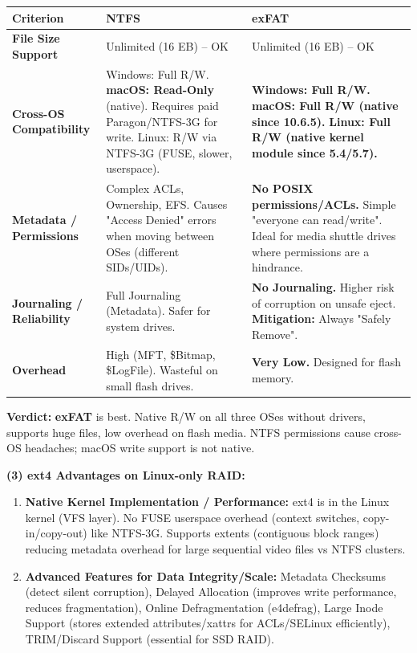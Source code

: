 \documentclass[11pt]{article}
\newcommand{\cle}[1]{{\popxbold\color{popdark}#1}}
\begin{document}
\begin{exoresolu}
\begin{center}
\begin{tabularx}{\linewidth}{|l|X|X|}
\hline
\rowcolor{popblueL}
\textbf{Criterion} & \textbf{NTFS} & \textbf{exFAT} \\
\hline
\textbf{File Size Support} & Unlimited (16 EB) -- OK & Unlimited (16 EB) -- OK \\
\hline
\textbf{Cross-OS Compatibility} & Windows: Full R/W. \textbf{macOS: Read-Only} (native). Requires paid Paragon/NTFS-3G for write. Linux: R/W via NTFS-3G (FUSE, slower, userspace). & \textbf{Windows: Full R/W.} \textbf{macOS: Full R/W (native since 10.6.5).} \textbf{Linux: Full R/W (native kernel module since 5.4/5.7).} \\
\hline
\textbf{Metadata / Permissions} & Complex ACLs, Ownership, EFS. Causes "Access Denied" errors when moving between OSes (different SIDs/UIDs). & \textbf{No POSIX permissions/ACLs.} Simple "everyone can read/write". Ideal for media shuttle drives where permissions are a hindrance. \\
\hline
\textbf{Journaling / Reliability} & Full Journaling (Metadata). Safer for system drives. & \textbf{No Journaling.} Higher risk of corruption on unsafe eject. \textbf{Mitigation:} Always "Safely Remove". \\
\hline
\textbf{Overhead} & High (MFT, \$Bitmap, \$LogFile). Wasteful on small flash drives. & \textbf{Very Low.} Designed for flash memory. \\
\hline
\end{tabularx}
\end{center}

\textbf{Verdict:} \textbf{exFAT} is best. Native R/W on all three OSes without drivers, supports huge files, low overhead on flash media. NTFS permissions cause cross-OS headaches; macOS write support is not native.

\noindent\textbf{(3) ext4 Advantages on Linux-only RAID:}
\begin{enumerate}
    \item \textbf{Native Kernel Implementation / Performance:} ext4 is in the Linux kernel (VFS layer). No FUSE userspace overhead (context switches, copy-in/copy-out) like NTFS-3G. Supports \cle{extents} (contiguous block ranges) reducing metadata overhead for large sequential video files vs NTFS clusters.
    \item \textbf{Advanced Features for Data Integrity/Scale:} \cle{Metadata Checksums} (detect silent corruption), \cle{Delayed Allocation} (improves write performance, reduces fragmentation), \cle{Online Defragmentation (e4defrag)}, \cle{Large Inode Support} (stores extended attributes/xattrs for ACLs/SELinux efficiently), \cle{TRIM/Discard Support} (essential for SSD RAID).
\end{enumerate}


\end{exoresolu}
\end{document}
